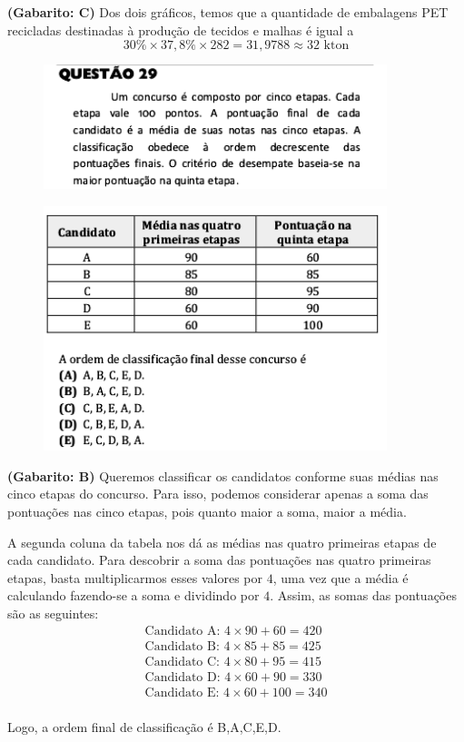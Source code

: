 \documentclass[a4paper]{article}
\begin{document}
\par\textbf{(Gabarito: C)} Dos dois gráficos, temos que a quantidade de embalagens PET recicladas destinadas à produção de tecidos e malhas é igual a
\begin{equation*}
30\%\times 37,8\%\times 282 = 31,9788 \approx 32\text{ kton}
\end{equation*}
\begin{figure}[H]
	\begin{center}
		\includegraphics[width=10cm]{L1Q29_1.png}
	\end{center}
\end{figure}
\begin{figure}[H]
	\begin{center}
		\includegraphics[width=10cm]{L1Q29_2.png}
	\end{center}
\end{figure}
\par\textbf{(Gabarito: B)} Queremos classificar os candidatos conforme suas médias nas cinco etapas do concurso. Para isso, podemos considerar apenas a soma das pontuações nas cinco etapas, pois quanto maior a soma, maior a média. 
\par\vspace{0.3cm} A segunda coluna da tabela nos dá as médias nas quatro primeiras etapas de cada candidato. Para descobrir a soma das pontuações nas quatro primeiras etapas, basta multiplicarmos esses valores por $4$, uma vez que a média é calculando fazendo-se a soma e dividindo por $4$. Assim, as somas das pontuações são as seguintes:
\begin{align*}
\text{Candidato A: }4\times 90 + 60 = 420 \\
\text{Candidato B: }4\times 85 + 85 = 425 \\
\text{Candidato C: }4\times 80 + 95 = 415 \\
\text{Candidato D: }4\times 60 + 90 = 330 \\
\text{Candidato E: }4\times 60 + 100 = 340 \\
\end{align*}
\par\vspace{0.3cm} Logo, a ordem final de classificação é B,A,C,E,D.
\end{document}
